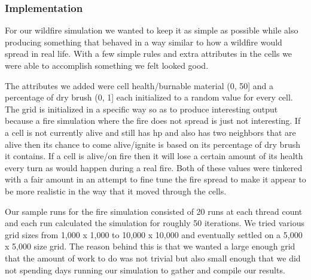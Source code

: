 \documentclass[12pt]{article}
\begin{document}
\subsubsection{Implementation}
For our wildfire simulation we wanted to keep it as simple as possible while also producing something that behaved in a way similar to how a wildfire would spread in real life. With a few simple rules and extra attributes in the cells we were able to accomplish something we felt looked good.
\par
The attributes we added were cell health/burnable material (0, 50] and a percentage of dry brush (0, 1] each initialized to a random value for every cell. The grid is initialized in a specific way so as to produce interesting output because a fire simulation where the fire does not spread is just not interesting. If a cell is not currently alive and still has hp and also has two neighbors that are alive then its chance to come alive/ignite is based on its percentage of dry brush it contains. If a cell is alive/on fire then it will lose a certain amount of its health every turn as would happen during a real fire. Both of these values were tinkered with a fair amount in an attempt to fine tune the fire spread to make it appear to be more realistic in the way that it moved through the cells. 
\par
Our sample runs for the fire simulation consisted of 20 runs at each thread count and each run calculated the simulation for roughly 50 iterations. We tried various grid sizes from 1,000 x 1,000 to 10,000 x 10,000 and eventually settled on a 5,000 x 5,000 size grid. The reason behind this is that we wanted a large enough grid that the amount of work to do was not trivial but also small enough that we did not spending days running our simulation to gather and compile our results. 
\end{document}
